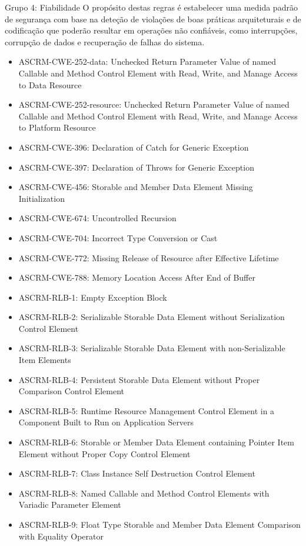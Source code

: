 \documentclass[openany,10pt,a4paper]{article}
\begin{document}
\begin{longtable}
\begin{appendix}
Grupo 4: Fiabilidade
O propósito destas regras é estabelecer uma medida padrão de segurança com base na deteção de violações de boas práticas arquiteturais e de codificação que poderão resultar em operações não confiáveis, como interrupções, corrupção de dados e recuperação de falhas do sistema.
\begin{itemize}
	\setlength\itemsep{0em}
	\item ASCRM-CWE-252-data: Unchecked Return Parameter Value of named Callable and Method Control Element with Read, Write, and Manage Access to Data Resource
	\item ASCRM-CWE-252-resource: Unchecked Return Parameter Value of named Callable and Method Control Element with Read, Write, and Manage Access to Platform Resource
	\item ASCRM-CWE-396: Declaration of Catch for Generic Exception
	\item ASCRM-CWE-397: Declaration of Throws for Generic Exception
	\item ASCRM-CWE-456: Storable and Member Data Element Missing Initialization
	\item ASCRM-CWE-674: Uncontrolled Recursion
	\item ASCRM-CWE-704: Incorrect Type Conversion or Cast
	\item ASCRM-CWE-772: Missing Release of Resource after Effective Lifetime
	\item ASCRM-CWE-788: Memory Location Access After End of Buffer
	\item ASCRM-RLB-1: Empty Exception Block
	\item ASCRM-RLB-2: Serializable Storable Data Element without Serialization Control Element
	\item ASCRM-RLB-3: Serializable Storable Data Element with non-Serializable Item Elements
	\item ASCRM-RLB-4: Persistent Storable Data Element without Proper Comparison Control Element
	\item ASCRM-RLB-5: Runtime Resource Management Control Element in a Component Built to Run on Application Servers
	\item ASCRM-RLB-6: Storable or Member Data Element containing Pointer Item Element without Proper Copy Control Element
	\item ASCRM-RLB-7: Class Instance Self Destruction Control Element
	\item ASCRM-RLB-8: Named Callable and Method Control Elements with Variadic Parameter Element
	\item ASCRM-RLB-9: Float Type Storable and Member Data Element Comparison with Equality Operator

\end{itemize}
\end{appendix}
\end{longtable}
\end{document}
